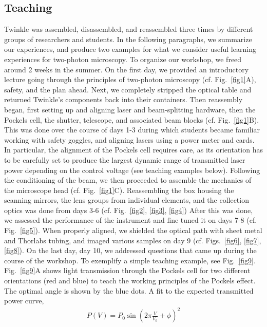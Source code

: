 \documentclass[10pt,letterpaper]{article}
\begin{document}
\subsection*{Teaching}
Twinkle was assembled, disassembled, and reassembled three times by different groups of researchers and students. In the following paragraphs, we summarize our experiences, and produce two examples for what we consider useful learning experiences for two-photon microscopy.\newline
To organize our workshop, we freed around 2 weeks in the summer. On the first day, we provided an introductory lecture going through the principles of two-photon microscopy (cf. Fig.~\ref{fig1}A), safety, and the plan ahead. Next, we completely stripped the optical table and returned Twinkle's components back into their containers. Then reassembly began, first setting up and aligning laser and beam-splitting hardware, then the Pockels cell, the shutter, telescope, and associated beam blocks (cf. Fig.~\ref{fig1}B). This was done over the course of days 1-3 during which students became familiar working with safety goggles, and aligning lasers using a power meter and cards. In particular, the alignment of the Pockels cell requires care, as its orientation has to be carefully set to produce the largest dynamic range of transmitted laser power depending on the control voltage (see teaching examples below). Following the conditioning of the beam, we then proceeded to assemble the mechanics of the microscope head (cf. Fig.~\ref{fig1}C). Reassembling the box housing the scanning mirrors, the lens groups from individual elements, and the collection optics was done from days 3-6 (cf. Fig.~\ref{fig2}, \ref{fig3}, \ref{fig4}) After this was done, we assessed the performance of the instrument and fine tuned it on days 7-8 (cf. Fig.~\ref{fig5}). When properly aligned, we shielded the optical path with sheet metal and Thorlabs tubing, and imaged various samples on day 9 (cf. Figs.~\ref{fig6}, \ref{fig7}, \ref{fig8}). On the last day, day 10, we addressed questions that came up during the course of the workshop.\newline
To exemplify a simple teaching example, see Fig.~\ref{fig9}. Fig.~\ref{fig9}A shows light transmission through the Pockels cell for two different orientations (red and blue) to teach the working principles of the Pockels effect. The optimal angle is shown by the blue dots. A fit to the expected transmitted power curve, 
\begin{eqnarray}
    P(V) = P_0 \sin\left(2\pi\frac{V}{V_0} + \phi \right)^2
\end{eqnarray}
\end{document}
